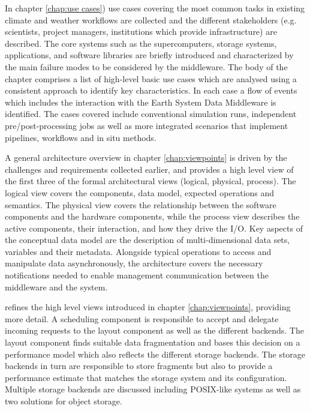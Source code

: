 \documentclass[a4paper,11pt]{esiwace-modified}
\begin{document}
In chapter \ref{chap:use cases}) use cases covering the most common tasks in existing climate and weather workflows are collected and
the different stakeholders (e.g. scientists, project managers, institutions which provide infrastructure) are described.
The core systems such as the supercomputers, storage systems, applications, and software libraries are briefly introduced and characterized by the main failure modes to be considered by the middleware.
The body of the chapter comprises a list of high-level basic use cases which are analysed using a consistent approach to identify key characteristics.
In each case a flow of events which includes the interaction with the Earth System Data Middleware is identified.
The cases covered include conventional simulation runs, independent pre/post-processing jobs as well as more integrated scenarios that implement pipelines, workflows and in situ methods.

A general architecture overview in chapter \ref{chap:viewpoints} is driven by the challenges and requirements collected earlier, and provides a high level view of the first three of the formal architectural views (logical, physical, process).
The logical view covers the components, data model, expected operations and semantics.
The physical view covers the relationship between the software components and the hardware components, while the process view describes the active components, their interaction, and how they drive the I/O.
Key aspects of the conceptual data model are the description of multi-dimensional data sets, variables and their metadata.
Alongside typical operations to access and manipulate data asynchronously, the architecture covers the necessary notifications needed to enable management communication between the middleware and the system.

 refines the high level views introduced in chapter \ref{chap:viewpoints}, providing more detail.
A scheduling component is responsible to accept and delegate incoming requests to the layout component as well as the different backends.
The layout component finds suitable data fragmentation and bases this decision on a performance model which also reflects the different storage backends.
The storage backends in turn are responsible to store fragments but also to provide a performance estimate that matches the storage system and its configuration.
Multiple storage backends are discussed including POSIX-like systems as well as two solutions for object storage.
\end{document}
